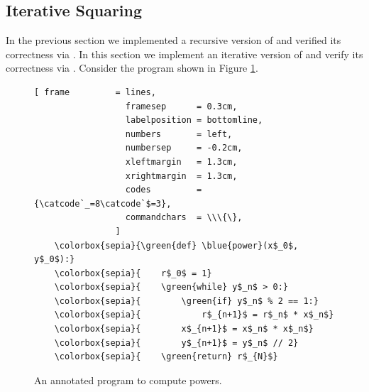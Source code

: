 \subsection{Iterative Squaring}
In the previous section we implemented a recursive version of  and verified its
correctness via .  In this section we implement an iterative version of
 and verify its correctness via .
Consider the program shown in Figure \ref{fig:power-iterative-annotated.stlx}. 

\begin{figure}[!h]
\centering
\begin{Verbatim}[ frame         = lines, 
                  framesep      = 0.3cm, 
                  labelposition = bottomline,
                  numbers       = left,
                  numbersep     = -0.2cm,
                  xleftmargin   = 1.3cm,
                  xrightmargin  = 1.3cm,
                  codes         = {\catcode`_=8\catcode`$=3},
                  commandchars  = \\\{\},
                ]
    \colorbox{sepia}{\green{def} \blue{power}(x$_0$, y$_0$):}
    \colorbox{sepia}{    r$_0$ = 1}
    \colorbox{sepia}{    \green{while} y$_n$ > 0:}
    \colorbox{sepia}{        \green{if} y$_n$ % 2 == 1:}
    \colorbox{sepia}{            r$_{n+1}$ = r$_n$ * x$_n$}
    \colorbox{sepia}{        x$_{n+1}$ = x$_n$ * x$_n$}
    \colorbox{sepia}{        y$_{n+1}$ = y$_n$ // 2}
    \colorbox{sepia}{    \green{return} r$_{N}$}
\end{Verbatim}
\vspace*{-0.3cm}
\caption{An annotated program to compute powers.}
\label{fig:power-iterative-annotated.stlx}
\end{figure} %

